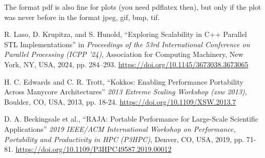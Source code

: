 \documentclass[sigconf]{acmart}
\begin{document}
The format pdf is also fine for plots (you need pdflatex then), but only if the
plot was never before in the format jpeg, gif, bmp, tif.


\begin{thebibliography}{1}

  R. Laso, D. Krupitza, and S. Hunold, ``Exploring Scalability in C++ Parallel STL Implementations'' in \textit{Proceedings of the 53rd International Conference on Parallel Processing (ICPP '24)},
  Association for Computing Machinery, New York, NY, USA, 2024, pp. 284--293.
  \url{https://doi.org/10.1145/3673038.3673065}

  H. C. Edwards and C. R. Trott, ``Kokkos: Enabling Performance Portability Across Manycore Architectures'' \textit{2013 Extreme Scaling Workshop (xsw 2013)},
  Boulder, CO, USA, 2013, pp. 18-24.
  \url{https://doi.org/10.1109/XSW.2013.7}

  D. A. Beckingsale et al., ``RAJA: Portable Performance for Large-Scale Scientific Applications'' \textit{2019 IEEE/ACM International Workshop on Performance, Portability and Productivity in HPC (P3HPC)},
  Denver, CO, USA, 2019, pp. 71-81.
  \url{https://doi.org/10.1109/P3HPC49587.2019.00012}

\end{thebibliography}
\end{document}
